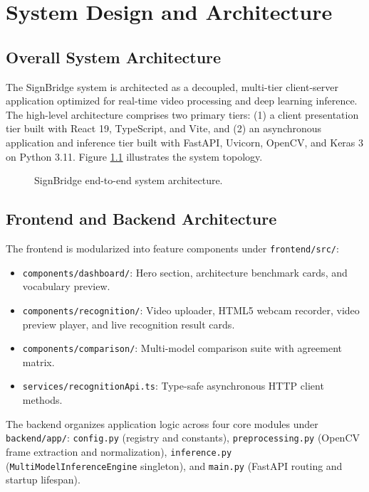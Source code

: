 \chapter{System Design and Architecture}
\label{ch:architecture}

\section{Overall System Architecture}
\label{sec:overall_architecture}
The SignBridge system is architected as a decoupled, multi-tier client-server application optimized for real-time video processing and deep learning inference. The high-level architecture comprises two primary tiers: (1) a client presentation tier built with React 19, TypeScript, and Vite, and (2) an asynchronous application and inference tier built with FastAPI, Uvicorn, OpenCV, and Keras 3 on Python 3.11. Figure \ref{fig:overall_arch} illustrates the system topology.

\begin{figure}[htbp]
\centering

\caption{SignBridge end-to-end system architecture.}
\label{fig:overall_arch}
\end{figure}

\section{Frontend and Backend Architecture}
\label{sec:fe_be_arch}
The frontend is modularized into feature components under \texttt{frontend/src/}:
\begin{itemize}
    \item \texttt{components/dashboard/}: Hero section, architecture benchmark cards, and vocabulary preview.
    \item \texttt{components/recognition/}: Video uploader, HTML5 webcam recorder, video preview player, and live recognition result cards.
    \item \texttt{components/comparison/}: Multi-model comparison suite with agreement matrix.
    \item \texttt{services/recognitionApi.ts}: Type-safe asynchronous HTTP client methods.
\end{itemize}

The backend organizes application logic across four core modules under \texttt{backend/app/}: \texttt{config.py} (registry and constants), \texttt{preprocessing.py} (OpenCV frame extraction and normalization), \texttt{inference.py} (\texttt{MultiModelInferenceEngine} singleton), and \texttt{main.py} (FastAPI routing and startup lifespan).

